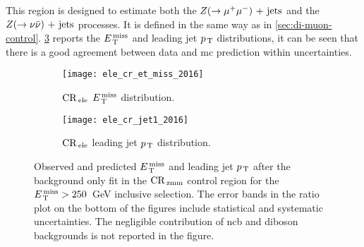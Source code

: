 This region is designed to estimate both the $Z (\rightarrow \mu^+ \mu^-)\mathrm{~+~jets}$ and the
$Z (\rightarrow \nu \bar{\nu})\mathrm{~+~jets}$ processes. It is defined in the same way as in
\cref{sec:di-muon-control}. \cref{fig:dimu_cr_plots} reports the $E_\mathrm{\, T}^\mathrm{\, miss}$ and
leading jet $p_\mathrm{\, T}$ distributions, it can be seen that there is a good agreement
between data and \gls{mc} prediction within uncertainties.
\begin{figure}[!th]
  \centering
  \begin{subfigure}[t]{.48\linewidth}
    \texttt{[image: ele\_cr\_et\_miss\_2016]}
    \caption{$\mathrm{CR}_\mathrm{\, ele}$ $E_\mathrm{\, T}^\mathrm{\, miss}$ distribution.}
    \label{fig:ele_cr_met}
  \end{subfigure}
  \begin{subfigure}[t]{.48\linewidth}
    \texttt{[image: ele\_cr\_jet1\_2016]}
    \caption{$\mathrm{CR}_\mathrm{\, ele}$ leading jet $p_\mathrm{\, T}$ distribution.}
    \label{fig:ele_cr_jet1}
  \end{subfigure}
  \caption{Observed and predicted $E_\mathrm{\, T}^\mathrm{\, miss}$ and leading jet $p_\mathrm{\, T}$ after the
    background only fit in the $\mathrm{CR}_\mathrm{\, zmm}$ control region for the $E_\mathrm{\, T}^\mathrm{\, miss} > 250$~GeV
    inclusive selection. The error bands in the ratio plot on the bottom of the
    figures include statistical and systematic uncertainties. The negligible
    contribution of \gls{ncb} and diboson backgrounds is not reported in the
    figure.}
  \label{fig:dimu_cr_plots}
\end{figure}
